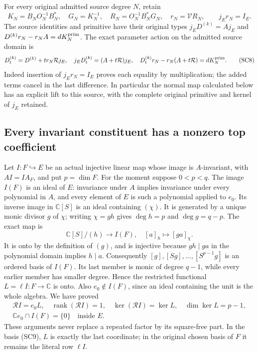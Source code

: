 \documentclass{article}
\begin{document}
For every original admitted source degree $N$, retain
\[
 K_N=B_NO_N^{-1}B_N^*,\quad G_N=K_N^{-1},\quad
 R_N=O_N^{-1}B_N^*G_N,\quad r_N=\mathcal V R_N,
 \qquad j_Er_N=I_E.
 \tag{SC7}
\]
The source identities and primitive have their original types
$j_ED^{(k)}=Aj_E$ and
$D^{(k)}r_N-r_NA=dK_N^{\rm prim}$.
The exact parameter action on the admitted source domain is
\[
 D_t^{(k)}=D^{(k)}+t r_N\mathcal Rj_E,
 \quad j_ED_t^{(k)}=(A+t\mathcal R)j_E,
 \quad D_t^{(k)}r_N-r_N(A+t\mathcal R)=dK_N^{\rm prim}.
 \tag{SC8}
\]
Indeed insertion of $j_Er_N=I_E$ proves each equality by multiplication;
the added terms cancel in the last difference.  In particular the
normal map calculated below has an explicit lift to this source, with
the complete original primitive and kernel of $j_E$ retained.

\subsection{Every invariant constituent has a nonzero top coefficient}

Let $I:F\hookrightarrow E$ be an actual injective linear map whose
image is $A$-invariant, with $AI=IA_F$, and put $p=\dim F$.
For the moment suppose $0<p<q$.  The image $I(F)$ is an ideal of
$E$: invariance under $A$ implies invariance under every polynomial
in $A$, and every element of $E$ is such a polynomial applied to $e_0$.
Its inverse image in $\mathbb C[S]$ is an ideal containing $(\chi)$.
It is generated by a unique monic divisor $g$ of $\chi$; writing
$\chi=gh$ gives $\deg h=p$ and $\deg g=q-p$.  The exact map is
\[
 \mathbb C[S]/(h)\longrightarrow I(F),\quad [a]_h\longmapsto[ga]_\chi.
 \tag{SC9}
\]
It is onto by the definition of $(g)$, and is injective because
$gh\mid ga$ in the polynomial domain implies $h\mid a$.
Consequently $[g],[Sg],\ldots,[S^{p-1}g]$ is an ordered basis of
$I(F)$.  Its last member is monic of degree $q-1$, while every earlier
member has smaller degree.  Hence the restricted functional
$L=\ell I:F\to\mathbb C$ is onto.  Also $e_0\notin I(F)$, since an
ideal containing the unit is the whole algebra.  We have proved
\[
 \begin{gathered}
 \mathcal R I=e_0L,\quad \operatorname{rank}(\mathcal R I)=1,
 \quad\ker(\mathcal R I)=\ker L,\quad\dim\ker L=p-1,\\
 \mathbb C e_0\cap I(F)=\{0\}\quad\text{inside }E.
 \end{gathered}
 \tag{SC10}
\]
These arguments never replace a repeated factor by its square-free
part.  In the basis (SC9), $L$ is exactly the last coordinate; in the
original chosen basis of $F$ it remains the literal row $\ell I$.
\end{document}
